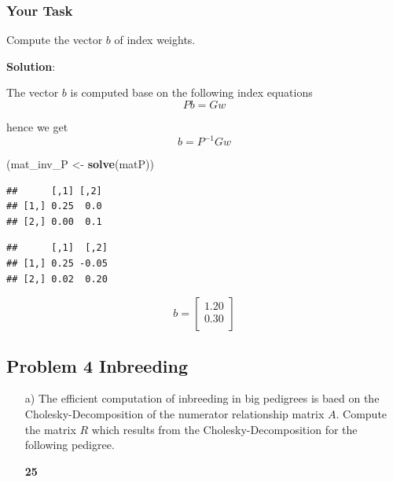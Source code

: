 \documentclass[]{article}
\newenvironment{Shaded}{\begin{snugshade}}{\end{snugshade}}
\newcommand{\KeywordTok}[1]{\textcolor[rgb]{0.13,0.29,0.53}{\textbf{#1}}}
\newcommand{\StringTok}[1]{\textcolor[rgb]{0.31,0.60,0.02}{#1}}
\newcommand{\OperatorTok}[1]{\textcolor[rgb]{0.81,0.36,0.00}{\textbf{#1}}}
\newcommand{\NormalTok}[1]{#1}
\newcommand{\points}[1]
{\begin{flushright}\textbf{#1}\end{flushright}}
\newcommand{\sol}
{\vspace{2ex}\textbf{Solution}:}
\begin{document}
\subsubsection{Your Task}\label{your-task-2}

Compute the vector \(b\) of index weights.

\sol

The vector \(b\) is computed base on the following index equations
\[Pb = Gw\]

hence we get \[b = P^{-1}Gw\]

\begin{Shaded}
\begin{Highlighting}[]
\NormalTok{(mat_inv_P <-}\StringTok{ }\KeywordTok{solve}\NormalTok{(matP))}
\end{Highlighting}
\end{Shaded}

\begin{verbatim}
##      [,1] [,2]
## [1,] 0.25  0.0
## [2,] 0.00  0.1
\end{verbatim}

\begin{Shaded}
\end{Shaded}

\begin{verbatim}
##      [,1]  [,2]
## [1,] 0.25 -0.05
## [2,] 0.02  0.20
\end{verbatim}

\[b = \left[
\begin{array}{r}
  1.20 \\ 
  0.30 \\ 
  \end{array}\right]
\]

\clearpage
\pagebreak

\subsection{Problem 4 Inbreeding}\label{problem-4-inbreeding}

\begin{enumerate}
\item[a)] The efficient computation of inbreeding in big pedigrees is baed on the Cholesky-Decomposition of the numerator relationship matrix $A$. Compute the matrix $R$ which results from the Cholesky-Decomposition for the following pedigree.
\points{25}
\end{enumerate}
\end{document}
